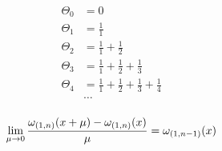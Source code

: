 \begin{equation*} \begin{aligned}
\Theta_0 &= 0 \\
\Theta_1 &= 
  \frac{1}{1} \\
\Theta_2 &= 
  \frac{1}{1} 
+ \frac{1}{2} \\
\Theta_3 &= 
  \frac{1}{1} 
+ \frac{1}{2} 
+ \frac{1}{3} \\
\Theta_4 &= 
  \frac{1}{1} 
+ \frac{1}{2} 
+ \frac{1}{3} 
+ \frac{1}{4} \\
&\ldots \\
\end{aligned} \end{equation*}

\begin{equation*}
\lim_{\mu \to 0} \frac{\omega_{(1, n)}(x + \mu) - \omega_{(1, n)}(x)}{\mu} = \omega_{(1, n - 1)}(x) \\
\end{equation*}
